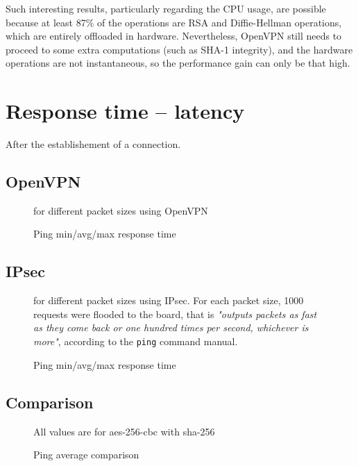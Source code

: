 Such interesting results, particularly regarding the CPU usage, are possible because at least 87\% of the operations are RSA and Diffie-Hellman operations, which are entirely offloaded in hardware.
Nevertheless, OpenVPN still needs to proceed to some extra computations (such as SHA-1 integrity), and the hardware operations are not instantaneous, so the performance gain can only be that high.



\section{Response time -- latency}
After the establishement of a connection.

\subsection{OpenVPN}

\begin{figure}[ht]

\caption{Ping min/avg/max response time}{for different packet sizes using OpenVPN}
\label{fig:ping-benchmark-openvpn}
\end{figure}

\subsection{IPsec}

\begin{figure}[ht]

\caption{Ping min/avg/max response time}{for different packet sizes using IPsec. For each packet size, 1000 requests were flooded to the board, that is \textit{"outputs packets as fast as they come back or one hundred times per second, whichever is more"}, according to the \texttt{ping} command manual.} %
\label{fig:ping-benchmark-ipsec}
\end{figure}



\subsection{Comparison}

\begin{figure}[ht]

\caption{Ping average comparison}{All values are for aes-256-cbc with sha-256}
\label{fig:ping-benchmark-comparison}
\end{figure}


